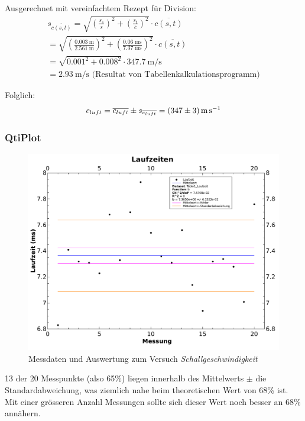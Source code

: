 Ausgerechnet mit vereinfachtem Rezept f\"ur Division:
\begin{gather*}
    s_{\overline{c(s,t)}} = \sqrt{ \left( \frac{s_{s}}{s} \right)^2 + \left( \frac{s_{t}}{\overline{c}} \right)^2} \cdot \overline{c(s,t)} \\
    = \sqrt{ \left( \frac{\SI{0.003}{\meter}}{\SI{2.561}{\meter}} \right)^2 + \left( \frac{\SI{0.06}{\milli\second}}{\SI{7.37}{\milli\second}} \right)^2 } \cdot \overline{c(s,t)} \\
    = \sqrt{ 0.001^2 + 0.008^2} \cdot \SI{347.7}{\meter\per\second} \\
    = \SI{2.93}{\meter\per\second} \text{ (Resultat von Tabellenkalkulationsprogramm)}
\end{gather*}


Folglich:
\begin{equation}
    c_{luft} = \overline{c_{luft}} \pm s_{\overline{c_{luft}}} = \SI[separate-uncertainty = true]{347 \pm 3}{\meter\per\second}
\end{equation}

\clearpage
\subsubsection{QtiPlot}
\begin{figure}[th!]
    \centering
    \includegraphics[width=\textwidth]{images/aufgabe1.pdf}
    \caption{Messdaten und Auswertung zum Versuch \emph{Schallgeschwindigkeit}}
    \label{fig:gauss}
\end{figure}

13 der  20 Messpunkte (also 65\%)  liegen innerhalb des Mittelwerts  $\pm$ die
Standardabweichung,  was  ziemlich  nahe  beim  theoretischen  Wert  von  68\%
ist. Mit  einer gr\"osseren  Anzahl  Messungen sollte  sich  dieser Wert  noch
besser an 68\% ann\"ahern.

